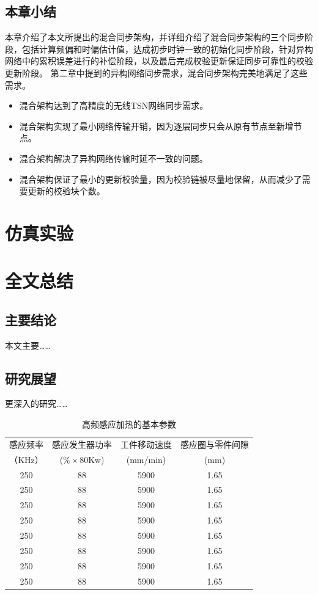 \documentclass[UTF8,a4paper,12pt]{ctexart}
\numberwithin{equation}{section}
\begin{document}
\subsection{本章小结}
本章介绍了本文所提出的混合同步架构，并详细介绍了混合同步架构的三个同步阶段，包括计算频偏和时偏估计值，达成初步时钟一致的初始化同步阶段，针对异构网络中的累积误差进行的补偿阶段，以及最后完成校验更新保证同步可靠性的校验更新阶段。
第二章中提到的异构网络同步需求，混合同步架构完美地满足了这些需求。
\begin{itemize}
	\item 混合架构达到了高精度的无线TSN网络同步需求。
	\item 混合架构实现了最小网络传输开销，因为逐层同步只会从原有节点至新增节点。
	\item 混合架构解决了异构网络传输时延不一致的问题。
	\item 混合架构保证了最小的更新校验量，因为校验链被尽量地保留，从而减少了需要更新的校验块个数。
\end{itemize}

\newpage
{}
\section{仿真实验}

\section{全文总结}

\subsection{主要结论}
本文主要……

\subsection{研究展望}
更深入的研究……
\begin{table}[!htbp]
	\centering
	\caption{高频感应加热的基本参数}
	\begin{tabular}{|c| c|c|c|}
		\hline
		感应频率 &感应发生器功率 & 工件移动速度  &感应圈与零件间隙\\
		（KHz）&($\% \times$80Kw) &(mm/min)  &(mm)\\
		\hline
		250 &88 &5900 &1.65\\
		\hline
		250 &88 &5900 &1.65\\
		\hline
		250 &88 &5900 &1.65\\
		\hline
		250 &88 &5900 &1.65\\
		\hline
		250 &88 &5900 &1.65\\
		\hline
		250 &88 &5900 &1.65\\
		\hline
		250 &88 &5900 &1.65\\
		\hline
		250 &88 &5900 &1.65\\
		\hline
	\end{tabular}
\end{table}
\end{document}

